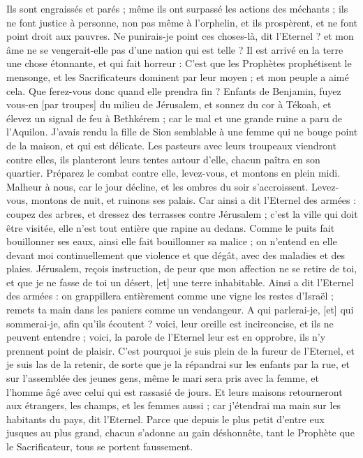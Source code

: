\begin{multicols}{2}
Ils sont engraissés et parés ; même ils ont surpassé les actions des méchants ; ils ne font justice à personne, non pas même à l'orphelin, et ils prospèrent, et ne font point droit aux pauvres.
Ne punirais-je point ces choses-là, dit l'Eternel ? et mon âme ne se vengerait-elle pas d'une nation qui est telle ?
Il est arrivé en la terre une chose étonnante, et qui fait horreur :
C'est que les Prophètes prophétisent le mensonge, et les Sacrificateurs dominent par leur moyen ; et mon peuple a aimé cela. Que ferez-vous donc quand elle prendra fin ?
\VerseOne{}Enfants de Benjamin, fuyez vous-en [par troupes] du milieu de Jérusalem, et sonnez du cor à Tékoah, et élevez un signal de feu à Bethkérem ; car le mal et une grande ruine a paru de l'Aquilon.
J'avais rendu la fille de Sion semblable à une femme qui ne bouge point de la maison, et qui est délicate.
Les pasteurs avec leurs troupeaux viendront contre elles, ils planteront leurs tentes autour d'elle, chacun paîtra en son quartier.
Préparez le combat contre elle, levez-vous, et montons en plein midi. Malheur à nous, car le jour décline, et les ombres du soir s'accroissent.
Levez-vous, montons de nuit, et ruinons ses palais.
Car ainsi a dit l'Eternel des armées : coupez des arbres, et dressez des terrasses contre Jérusalem ; c'est la ville qui doit être visitée, elle n'est tout entière que rapine au dedans.
Comme le puits fait bouillonner ses eaux, ainsi elle fait bouillonner sa malice ; on n'entend en elle devant moi continuellement que violence et que dégât, avec des maladies et des plaies.
Jérusalem, reçois instruction, de peur que mon affection ne se retire de toi, et que je ne fasse de toi un désert, [et] une terre inhabitable.
Ainsi a dit l'Eternel des armées : on grappillera entièrement comme une vigne les restes d'Israël ; remets ta main dans les paniers comme un vendangeur.
A qui parlerai-je, [et] qui sommerai-je, afin qu'ils écoutent ? voici, leur oreille est incirconcise, et ils ne peuvent entendre ; voici, la parole de l'Eternel leur est en opprobre, ils n'y prennent point de plaisir.
C'est pourquoi je suis plein de la fureur de l'Eternel, et je suis las de la retenir, de sorte que je la répandrai sur les enfants par la rue, et sur l'assemblée des jeunes gens, même le mari sera pris avec la femme, et l'homme âgé avec celui qui est rassasié de jours.
Et leurs maisons retourneront aux étrangers, les champs, et les femmes aussi ; car j'étendrai ma main sur les habitants du pays, dit l'Eternel.
Parce que depuis le plus petit d'entre eux jusques au plus grand, chacun s'adonne au gain déshonnête, tant le Prophète que le Sacrificateur, tous se portent faussement.

\end{multicols}
